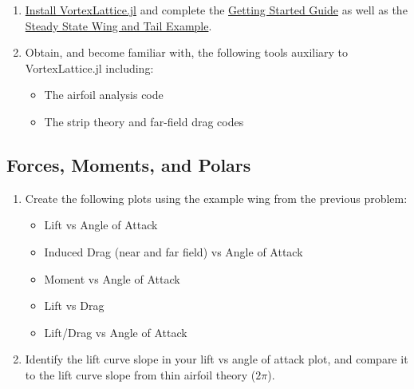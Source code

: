 \documentclass[11pt,twocolumn]{article}
\begin{document}
\begin{enumerate}[label=\roman*.]
	\item \href{https://flow.byu.edu/VortexLattice.jl/stable/#Installation}{Install VortexLattice.jl} and complete the \href{https://flow.byu.edu/VortexLattice.jl/stable/guide/}{Getting Started Guide} as well as the \href{https://flow.byu.edu/VortexLattice.jl/stable/examples/#Steady-State-Analysis-of-a-Wing-and-Tail}{Steady State Wing and Tail Example}.
	\item Obtain, and become familiar with, the following tools auxiliary to VortexLattice.jl including:
	\begin{itemize}
		\item The airfoil analysis code
		\item The strip theory and far-field drag codes
	\end{itemize}
\end{enumerate}


\subsection{Forces, Moments, and Polars}

\begin{enumerate}[label=\roman*.]
	\item Create the following plots using the example wing from the previous problem:
	\begin{itemize}
		\item Lift vs Angle of Attack
		\item Induced Drag (near and far field) vs Angle of Attack
		\item Moment vs Angle of Attack
		\item Lift vs Drag
		\item Lift/Drag vs Angle of Attack
	\end{itemize}
	\item Identify the lift curve slope in your lift vs angle of attack plot, and compare it to the lift curve slope from thin airfoil theory (\(2\pi\)).
\end{enumerate}
\end{document}
